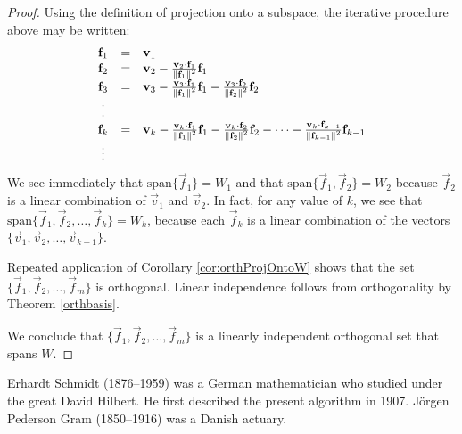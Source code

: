 \documentclass{ximera}
\begin{document}
\begin{proof}
Using the definition of projection onto a subspace, the iterative procedure above may be written:
\begin{equation}\label{eqn:GSproof}
\begin{array}{ccl}
\mathbf{f}_{1} &=& \mathbf{v}_{1} \\
\mathbf{f}_{2} &=& \mathbf{v}_{2} - \frac{\mathbf{v}_{2} \cdot \mathbf{f}_{1}}{\left\lVert\mathbf{f}_{1}\right\rVert^2}\mathbf{f}_{1} \\
\mathbf{f}_{3} &=& \mathbf{v}_{3} - \frac{\mathbf{v}_{3} \cdot \mathbf{f}_{1}}{\left\lVert\mathbf{f}_{1}\right\rVert^2}\mathbf{f}_{1} - \frac{\mathbf{v}_{3} \cdot \mathbf{f}_{2}}{\left\lVert\mathbf{f}_{2}\right\rVert^2}\mathbf{f}_{2} \\
\vdots &&\\
\mathbf{f}_{k} &=& \mathbf{v}_{k} - \frac{\mathbf{v}_{k} \cdot \mathbf{f}_{1}}{\left\lVert\mathbf{f}_{1}\right\rVert^2}\mathbf{f}_{1} - \frac{\mathbf{v}_{k} \cdot \mathbf{f}_{2}}{\left\lVert\mathbf{f}_{2}\right\rVert^2}\mathbf{f}_{2} - \dots -\frac{\mathbf{v}_{k} \cdot \mathbf{f}_{k-1}}{\left\lVert\mathbf{f}_{k-1}\right\rVert^2}\mathbf{f}_{k-1} \\
\vdots &&
\end{array}
\end{equation}
We see immediately that $\mbox{span}\{\vec{f}_{1}\}=W_1$ and that $\mbox{span}\{\vec{f}_{1},\vec{f}_{2}\}=W_2$ because $\vec{f}_{2}$ is a linear combination of $\vec{v}_{1}$ and $\vec{v}_{2}$.  In fact, for any value of $k$, we see that $\mbox{span}\{\vec{f}_{1},\vec{f}_{2},\ldots,\vec{f}_{k}\}=W_k$, because each $\vec{f}_{k}$ is a linear combination of the vectors $\{\vec{v}_{1},\vec{v}_{2},\ldots,\vec{v}_{k-1}\}$.

Repeated application of Corollary \ref{cor:orthProjOntoW} shows that the set
 $\{\vec{f}_{1},\vec{f}_{2},\ldots,\vec{f}_{m}\}$ is orthogonal.  Linear independence follows from orthogonality by Theorem \ref{orthbasis}.  

We conclude that $\{\vec{f}_{1},\vec{f}_{2},\ldots,\vec{f}_{m}\}$ is a linearly independent orthogonal set that spans $W$.
\end{proof}


\begin{remark}\label{rem:SchmidtPederson}Erhardt
 Schmidt (1876--1959) was a German mathematician who studied under the
great David Hilbert. He
 first described the present algorithm in 1907. J\"{o}rgen Pederson Gram
(1850--1916)  was a Danish actuary.
\end{remark}
\end{document}
